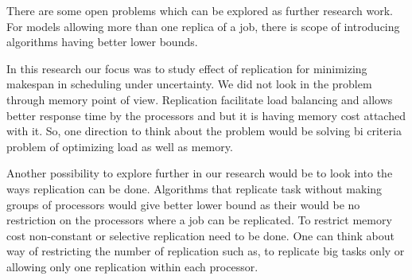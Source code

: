 \documentclass[10pt, conference, compsocconf]{IEEEtran}
\begin{document}
There are some open problems which can be explored as further research work. For models allowing more than one replica of a job, there is scope of introducing algorithms having better lower bounds.

 In this research our focus was to study effect of replication for minimizing makespan in scheduling under uncertainty. We did not look in the problem through memory point of view. Replication facilitate load balancing and allows better response time by the processors and  but it is having memory cost attached with it. So, one direction to think about the problem would be solving bi criteria problem of optimizing load as well as memory. 
 
 Another possibility to explore further in our research would be to look into the ways replication can be done. Algorithms that replicate task without making groups of processors would give better lower bound as their would be no restriction on the processors where a job can be replicated. To restrict memory cost non-constant or selective replication need to be done. One can think about way of restricting the number of replication such as, to replicate big tasks only or allowing only one replication within each processor. 











%
%
%

\end{document}
